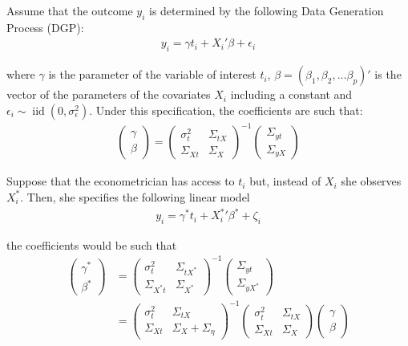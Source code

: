 \documentclass[12pt]{article}
\def\b{\beta}
\def\g{\gamma}
\begin{document}
Assume that the outcome $y_i$ is determined by the following Data Generation Process (DGP):
\begin{align}
    y_i = \gamma t_i + X_i'\beta + \epsilon_i
\end{align}

where $\g$ is the parameter of the variable of interest $t_i$, $\b=(\b_1,\b_2,\dots \b_p)'$ is the vector of the parameters of the covariates $X_i$ including a constant and $\epsilon_i \sim \operatorname{iid}(0,\sigma^2_\epsilon)$. Under this specification, the coefficients are such that:
\begin{align}
    \left(\begin{array}{l}
{\gamma} \\
{\beta}
\end{array}\right)=\left(\begin{array}{cc}
{\sigma}^2_{t} & \Sigma_{tX} \\
\Sigma_{Xt} & {\Sigma}_{X}
\end{array}\right)^{-1}\left(\begin{array}{c}
\Sigma_{yt} \\
\Sigma_{yX}
\end{array}\right)
\end{align}

Suppose that the econometrician has access to $t_i$ but, instead of $X_i$ she observes $X^*_i$. Then, she specifies the following linear model
\begin{align}
    y_i = \gamma^* t_i + {X^{*}_i}' \beta^* + \zeta_i
\end{align}

the coefficients would be such that
\begin{align}
    \left(\begin{array}{l}
{\gamma}^* \\
{\beta}^*
\end{array}\right)&=\left(\begin{array}{cc}
{\sigma}^2_{t} & \Sigma_{tX^*} \\
\Sigma_{X^*t} & {\Sigma}_{X^*}
\end{array}\right)^{-1}\left(\begin{array}{c}
\Sigma_{yt} \\
\Sigma_{yX^*}
\end{array}\right) \\
& =\left(\begin{array}{cc}
{\sigma}^2_{t} & \Sigma_{tX} \\
\Sigma_{Xt} & {\Sigma}_{X}+{\Sigma}_{\eta}
\end{array}\right)^{-1}\left(\begin{array}{cc}
{\sigma}^2_{t} & \Sigma_{tX} \\
\Sigma_{Xt} & {\Sigma}_{X}
\end{array}\right)\left(\begin{array}{l}
{\gamma} \\
{\beta}
\end{array}\right)
\end{align}
\end{document}
